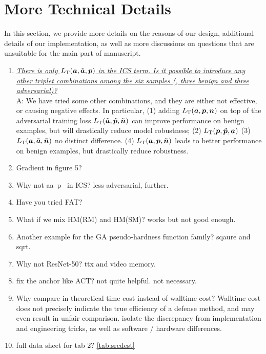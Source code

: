 \section{More Technical Details}

In this section, we provide more details on the reasons of our design,
additional details of our implementation, as well as more discussions
on questions that are unsuitable for the main part of manuscript.

\begin{enumerate}[noitemsep]
	\item \ul{\it There is only $L_\text{T}({\bm{a}}, \tilde{{\bm{a}}}, {\bm{p}})$ in the ICS
		term.  Is it possible to introduce any other triplet combinations among
		the six samples (\ie, three benign and three adversarial)?}\\
		A: We have tried some other combinations, and they are either not
		effective, or causing negative effects.
		In particular, (1) adding $L_\text{T}({\bm{a}}, {\bm{p}}, {\bm{n}})$ on top of the
		adversarial training loss
		$L_\text{T}(\tilde{{\bm{a}}},\tilde{{\bm{p}}},\tilde{{\bm{n}}})$ can improve
		performance on benign examples, but will drastically reduce model
		robustness;
		(2) $L_\text{T}({\bm{p}}, \tilde{{\bm{p}}}, {\bm{a}})$ 
		(3) $L_\text{T}({\bm{a}}, \tilde{{\bm{a}}}, \tilde{{\bm{n}}})$ no distinct difference.
		(4) $L_\text{T}({\bm{a}}, {\bm{p}}, \tilde{{\bm{n}}})$ leads to better performance
		on benign examples, but drastically reduce robustness.

	\item Gradient in figure 5?

	\item Why not aa~p~ in ICS?
		less adversarial, further.
	\item Have you tried FAT?
	\item What if we mix HM(RM) and HM(SM)?
		works but not good enough.
	\item Another example for the GA pseudo-hardness function family?
		sqaure and sqrt.
	\item Why not ResNet-50?
		ttx and video memory.
	\item fix the anchor like ACT?
		not quite helpful. not necessary.
	\item Why compare in theoretical time cost instead of walltime cost?
		Walltime cost does not precisely indicate the true efficiency
		of a defense method, and may even result in unfair comparison.
		isolate the discrepancy from implementation and engineering tricks,
		as well as software / hardware differences.
	\item full data sheet for tab 2?
		\cref{tab:srcdest}


\end{enumerate}
